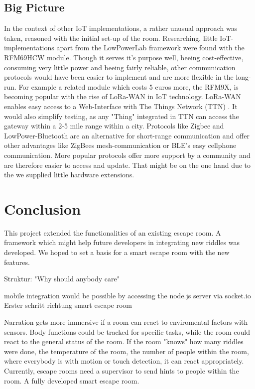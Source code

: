 \subsection{Big Picture}

In the context of other IoT implementations, a rather unusual approach was taken, reasoned with the initial set-up of the room.
Researching, little IoT-implementations apart from the LowPowerLab framework were found with the RFM69HCW module. 
Though it serves it's purpose well, beeing cost-effective, consuming very little power and beeing fairly reliable,
other communication protocols would have been easier to implement and are more flexible in the long-run.
For example a related module which costs 5 euros more, the RFM9X, is becoming popular with the rise of LoRa-WAN in IoT technology. 
LoRa-WAN enables easy access to a Web-Interface with The Things Network (TTN) \parencite{TTN}.
It would also simplify testing, as any "Thing" integrated in TTN can access the gateway within a 2-5 mile range within a city. 
Protocols like Zigbee and LowPower-Bluetooth are an alternative for short-range communication and offer other 
advantages like ZigBees mesh-communication or BLE's easy cellphone communication.
More popular protocols offer more support by a community and are therefore easier to access and update.
That might be on the one hand due to the 
we supplied little hardware extensions.


\section{Conclusion}
This project extended the functionalities of an existing escape room.
A framework which might help future developers in integrating new riddles was developed.
We hoped to set a basis for a smart escape room with the new features.


Struktur:
"Why should anybody care"


mobile integration would be possible by accessing the node.js server via socket.io
Erster schritt richtung smart escape room

Narration gets more immersive if a room can react to enviromental factors with sensors. 
Body functions could be tracked for specific tasks, while the room could react to the general status of the room. 
If the room "knows" how many riddles were done, the temperature of the room, 
the number of people within the room, where everybody is with motion or touch detection, it can react appropriately.
Currently, escape rooms need a supervisor to send hints to people within the room. 
A fully developed smart escape room.

